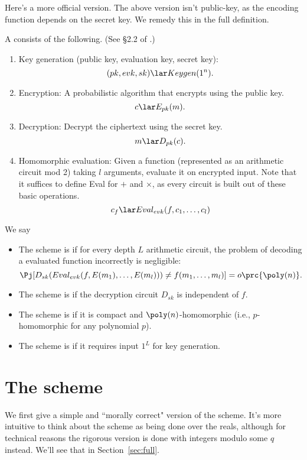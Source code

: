 Here's a more official version. The above version isn't public-key, as the encoding function depends on the secret key. We remedy this in the full definition.
\begin{df}
A  consists of the following. (See \S2.2 of \cite{Brakerski2012}.)
\begin{enumerate}
\item
Key generation (public key, evaluation key, secret key):
\[(pk,evk,sk)\lar Keygen(1^n).\]
\item
Encryption: A probabilistic algorithm that encrypts using the public key.
\[
c\lar E_{pk}(m).
\]
\item
Decryption: Decrypt the ciphertext using the secret key.
\[
m\lar D_{pk}(c).
\]
\item
Homomorphic evaluation: Given a function (represented as an arithmetic circuit mod 2) taking $l$ arguments, evaluate it on encrypted input. Note that it suffices to define Eval for $+$ and $\times$, as every circuit is built out of these basic operations.
\[
c_f \lar Eval_{evk} (f,c_1,\ldots, c_l)
\]
\end{enumerate}
We say
\begin{itemize}
\item
The scheme is  if for every depth $L$ arithmetic circuit, the problem of decoding a evaluated function incorrectly is negligible:
\[
\Pj[D_{sk}(Eval_{evk}(f,E(m_1),\ldots, E(m_l)))\ne f(m_1,\ldots, m_l)] =o\prc{\poly(n)}.
\]
\item
The scheme is  if the decryption circuit $D_{sk}$ is independent of $f$. 
\item
The scheme is  if it is compact and $\poly(n)$-homomorphic (i.e., $p$-homomorphic for any polynomial $p$).
\item
The scheme is  if it requires input $1^L$ for key generation.
\end{itemize}
\end{df}

\section{The scheme}

We first give a simple and ``morally correct" version of the scheme. It's more intuitive to think about the scheme as being done over the reals, although for technical reasons the rigorous version is done with integers modulo some $q$ instead. We'll see that in Section~\ref{sec:full}.


